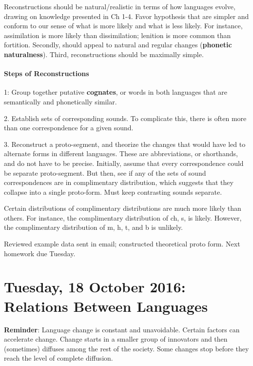 \documentclass{exam}
\begin{document}
Reconstructions should be natural/realistic in terms of how languages evolve, drawing on knowledge presented in Ch 1-4. Favor hypothesis that are simpler and conform to our sense of what is more likely and what is less likely. For instance, assimilation is more likely than dissimilation; lenition is more common than fortition. Secondly, should appeal to natural and regular changes (\textbf{phonetic naturalness}). Third, reconstructions should be maximally simple. 


\paragraph{Steps of Reconstructions}
1: Group together putative \textbf{cognates}, or words in both languages that are semantically and phonetically similar.

2. Establish sets of corresponding sounds. To complicate this, there is often more than one correspondence for a given sound. 

3. Reconstruct a proto-segment, and theorize the changes that would have led to alternate forms in different languages. These are abbreviations, or shorthands, and do not have to be precise. Initially, assume that every correspondence could be separate proto-segment. But then, see if any of the sets of sound correspondences are in complimentary distribution, which suggests that they collapse into a single proto-form. Must keep contrasting sounds separate. 



Certain distributions of complimentary distributions are much more likely than others. For instance, the complimentary distribution of ch, s,  is likely. However, the complimentary distribution of m, h, t,  and b is unlikely.

Reviewed example data sent in email; constructed theoretical proto form. Next homework due Tuesday.


\section*{Tuesday, 18 October 2016: Relations Between Languages}

\textbf{Reminder}: Language change is constant and unavoidable. Certain factors can accelerate change. Change starts in a smaller group of innovators and then (sometimes) diffuses among the rest of the society. Some changes stop before they reach the level of complete diffusion. 
\end{document}
